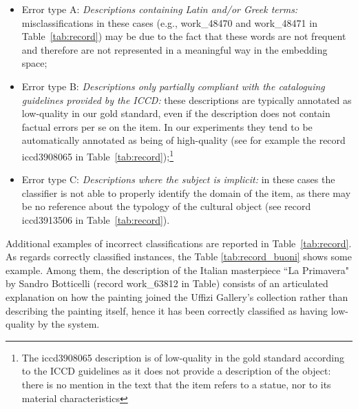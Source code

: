\documentclass[epsfig,a4paper,12pt,titlepage]{book}
\begin{document}
\begin{itemize}
    \item Error type A: \emph{Descriptions containing Latin and/or Greek terms:} misclassifications in these cases (e.g., work\_48470 and work\_48471 in Table~\ref{tab:record}) may be due to the fact that these words are not frequent and therefore are not represented in a meaningful way in the embedding space; 
    \item Error type B: \emph{Descriptions only partially compliant with the cataloguing guidelines provided by the ICCD:} these descriptions are typically annotated as low-quality in our gold standard, even if the description does not contain factual errors per se on the item. In our experiments they tend to be automatically annotated as being of high-quality  (see for example the record iccd3908065 in Table~\ref{tab:record});\footnote{The iccd3908065 description is of low-quality in the gold standard according to the ICCD guidelines as it does not provide a description of the object: there is no mention in the text that the item refers to a statue, nor to its material characteristics}
    \item Error type C: \emph{Descriptions where the subject is implicit:} in these cases the classifier is not able to properly identify the domain of the item, as there may be no reference about the typology of the cultural object (see record iccd3913506 in Table~\ref{tab:record}).
\end{itemize}

Additional examples of incorrect classifications are reported in Table~\ref{tab:record}.
As regards correctly classified instances, the Table \ref{tab:record_buoni} shows some example. Among them, the description of the Italian masterpiece ``La Primavera" by Sandro Botticelli (record work\_63812 in Table) consists of an articulated explanation on how the painting joined the Uffizi Gallery's collection rather than describing the painting itself, hence it has been correctly classified as having low-quality by the system.
\end{document}
